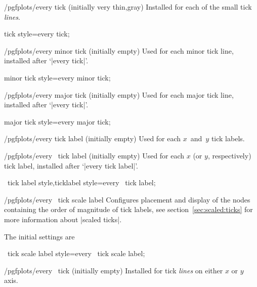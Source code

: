\begin{stylekey}{/pgfplots/every tick (initially very thin,gray)}
 Installed for each of the small tick \emph{lines}.
\end{stylekey}

\pgfplotsshortstylekey tick style=every tick;

\begin{stylekey}{/pgfplots/every minor tick  (initially empty)}
 Used for each minor tick line, installed after `|every tick|'.
\end{stylekey}

\pgfplotsshortstylekey minor tick style=every minor tick;

\begin{stylekey}{/pgfplots/every major tick (initially empty)}
 Used for each major tick line, installed after `|every tick|'.
\end{stylekey}

\pgfplotsshortstylekey major tick style=every major tick;

\begin{stylekey}{/pgfplots/every tick label (initially empty)}
 Used for each $x$~and~$y$ tick labels.
\end{stylekey}

\begin{xystylekey}{/pgfplots/every \x\ tick label (initially empty)}
 Used for each $x$ (or $y$, respectively) tick label, installed after `|every tick label|'.
\end{xystylekey}

\pgfplotsshortxystylekeys \x\ tick label style,\x ticklabel style=every \x\ tick label;

\begin{xystylekey}{/pgfplots/every \x\ tick scale label}
 Configures placement and display of the nodes containing the order of magnitude of tick labels, see section~\ref{sec:scaled:ticks} for more information about |scaled ticks|.

The initial settings are
\begin{codeexample}
\end{codeexample}
\end{xystylekey}

\pgfplotsshortxystylekey \x\ tick scale label style=every \x\ tick scale label;

\begin{xystylekey}{/pgfplots/every \x\ tick (initially empty)}
	Installed for tick \emph{lines} on either $x$ or $y$ axis.
\end{xystylekey}

